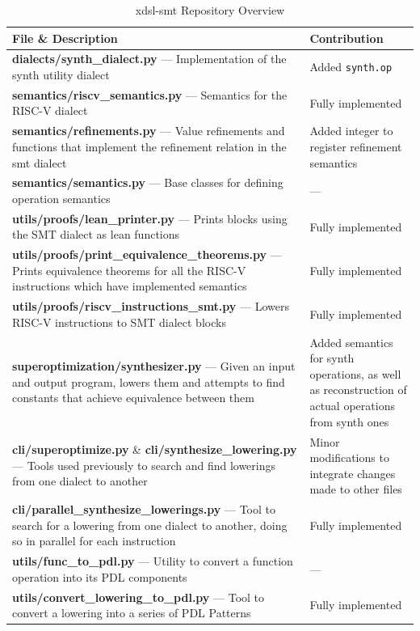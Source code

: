\begin{table}[htbp]
\centering
\footnotesize
\caption{xdsl-smt Repository Overview}
\begin{tabular}{p{9cm}p{6cm}}
\toprule
\textbf{File \& Description} & \textbf{Contribution} \\

\midrule
\textbf{dialects/synth\_dialect.py} --- Implementation of the synth utility dialect & Added \texttt{synth.op} \\

\midrule
\textbf{semantics/riscv\_semantics.py} --- Semantics for the RISC-V dialect & Fully implemented \\
\textbf{semantics/refinements.py} --- Value refinements and functions that implement the refinement relation in the smt dialect & Added integer to register refinement semantics \\
\textbf{semantics/semantics.py} --- Base classes for defining operation semantics & ---\\

\midrule
\textbf{utils/proofs/lean\_printer.py} --- Prints blocks using the SMT dialect as lean functions & Fully implemented \\
\textbf{utils/proofs/print\_equivalence\_theorems.py} --- Prints equivalence theorems for all the RISC-V instructions which have implemented semantics & Fully implemented \\
\textbf{utils/proofs/riscv\_instructions\_smt.py} --- Lowers RISC-V instructions to SMT dialect blocks & Fully implemented \\

\midrule
\textbf{superoptimization/synthesizer.py} --- Given an input and output program, lowers them and attempts to find 
constants that achieve equivalence between them & Added semantics for synth operations, as well as 
reconstruction of actual operations from synth ones\\

\midrule
\textbf{cli/superoptimize.py} \& \textbf{cli/synthesize\_lowering.py} --- Tools used previously to 
search and find lowerings from one dialect to another & Minor modifications to integrate changes made to other files \\
\textbf{cli/parallel\_synthesize\_lowerings.py} --- Tool to search for a lowering from one dialect to another, doing so in parallel for
each instruction & Fully implemented \\

\midrule
\textbf{utils/func\_to\_pdl.py} --- Utility to convert a function operation into its PDL components & --- \\
\textbf{utils/convert\_lowering\_to\_pdl.py} --- Tool to convert a lowering into a series of PDL Patterns & Fully implemented \\


\end{tabular}
\end{table}
